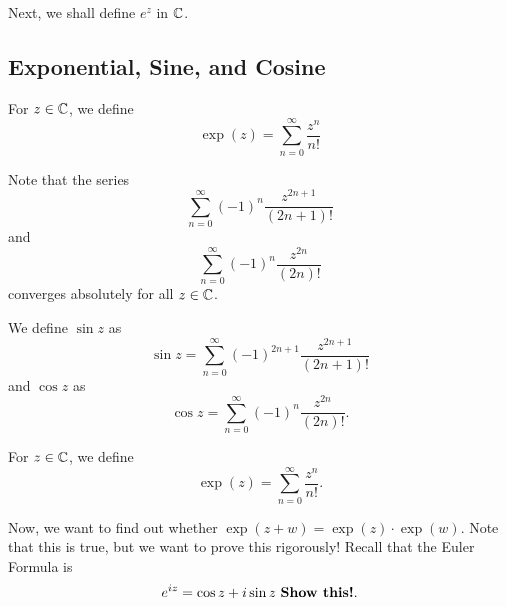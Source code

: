 \documentclass[a4paper]{report}
\begin{document}
Next, we shall define \( e^{z} \) in \( \mathbb{C}  \). 

\subsection{Exponential, Sine, and Cosine}

\begin{definition}
    For \( z \in \mathbb{C}  \), we define 
    \[ \exp(z) = \sum_{ n=0  }^{  \infty  } \frac{ z^{n} }{ n!  }   \]
\end{definition}
Note that the series 
            \[  \sum_{ n=0 }^{ \infty  } (-1)^{n} \frac{ z^{2n+1} }{ (2n+1)!  }  \]
            and 
            \[  \sum_{ n=0  }^{ \infty  } (-1)^{n} \frac{ z^{2n} }{ (2n)! }  \]
            converges absolutely for all \( z \in \mathbb{C}  \).
\begin{definition}
         We define  \( \sin z  \) as
            \[ \sin z = \sum_{ n=0 }^{ \infty  } (-1)^{2n+1} \frac{ z^{2n+1} }{ (2n+1)! } \]
            and \( \cos z  \) as 
            \[  \cos z  =  \sum_{ n = 0  }^{ \infty  } (-1)^{n} \frac{ z^{2n} }{ (2n)! }.  \]
\end{definition}

\begin{definition}[ ]
    For \( z \in \mathbb{C}  \), we define 
    \[  \exp(z) = \sum_{ n=0 }^{ \infty  } \frac{ z^{n} }{ n! }. \]
\end{definition}

Now, we want to find out whether \( \exp(z + w) = \exp(z) \cdot \exp(w) \). Note that this is true, but we want to prove this rigorously! Recall that the Euler Formula is
\[  e^{iz} = \cos z + i \sin z \  \text{\textbf{Show this!}}. \]
\end{document}

